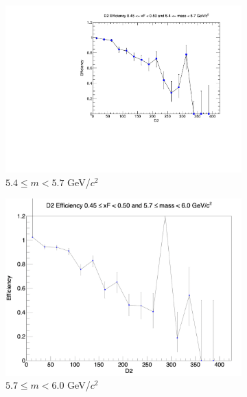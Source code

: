 \begin{figure}[p]
\begin{subfigure}[b]{0.32\textwidth}
        \includegraphics[width=\textwidth]{./kTrackerEfficiencyPlots/D2_Efficiency_xF9_mass4.pdf}
        \caption{$5.4 \leq m < 5.7$ GeV/$c^2$}
        \label{fig:xF9_mass4}
    \end{subfigure}
    \hfill
    \begin{subfigure}[b]{0.32\textwidth}
        \centering
        \includegraphics[width=\textwidth]{./kTrackerEfficiencyPlots/D2_Efficiency_xF9_mass5.png}
        \caption{$5.7 \leq m < 6.0$ GeV/$c^2$}
        \label{fig:xF9_mass5}
    \end{subfigure}
    \vspace{0.5cm}
    \begin{subfigure}[b]{0.32\textwidth}
        \centering

\end{subfigure}
\end{figure}

